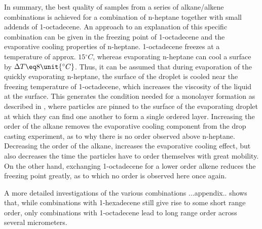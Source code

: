 \documentclass[\main/dresen_thesis.tex]{subfiles}
\begin{document}
  In summary, the best quality of samples from a series of alkane/alkene combinations is achieved for a combination of n-heptane together with small addends of 1-octadecene.
  An approach to an explanation of this specific combination can be given in the freezing point of 1-octadecene and the evaporative cooling properties of n-heptane.
  1-octadecene freezes at a temperature of approx. $15 \unit{^\circ C}$, whereas evaporating n-heptane can cool a surface by $\Delta T \eq 8 \unit{^\circ C}$.
  Thus, it can be assumed that during evaporation of the quickly evaporating n-heptane, the surface of the droplet is cooled near the freezing temperature of 1-octadecene, which increases the viscosity of the liquid at the surface.
  This generates the condition needed for a monolayer formation as described in \cite{Bigioni_2006_Kinet}, where particles are pinned to the surface of the evaporating droplet at which they can find one another to form a single ordered layer.
  Increasing the order of the alkane removes the evaporative cooling component from the drop casting experiment, as to why there is no order observed above n-heptane.
  Decreasing the order of the alkane, increases the evaporative cooling effect, but also decreases the time the particles have to order themselves with great mobility.
  On the other hand, exchanging 1-octadecene for a lower order alkene reduces the freezing point greatly, as to which no order is observed here once again.


  A more detailed investigations of the various combinations
  ...appendix..
  shows that, while combinations with 1-hexadecene still give rise to some short range order, only combinations with 1-octadecene lead to long range order across several micrometers.
\end{document}
